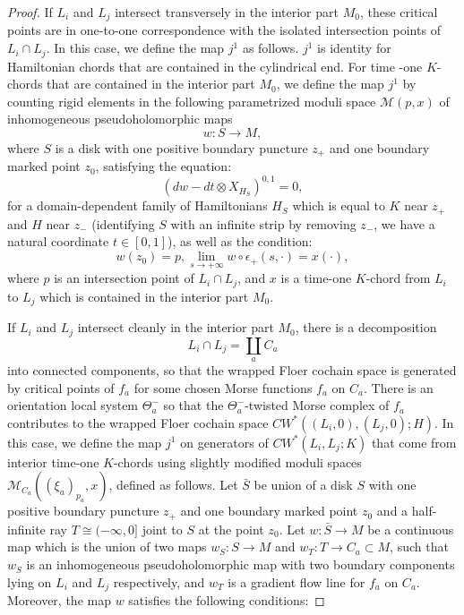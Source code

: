 \documentclass{amsart}
\numberwithin{equation}{section}
\numberwithin{figure}{section}
\begin{document}
\begin{proof}
	If $L_{i}$ and $L_{j}$ intersect transversely in the interior part $M_{0}$, these critical points are in one-to-one correspondence with the isolated intersection points of $L_{i} \cap L_{j}$. In this case, we define the map $j^{1}$ as follows. $j^{1}$ is identity for Hamiltonian chords that are contained in the cylindrical end. For time -one $K$-chords that are contained in the interior part $M_{0}$, we define the map $j^{1}$ by counting rigid elements in the following parametrized moduli space $\mathcal{M}(p, x)$ of inhomogeneous pseudoholomorphic maps
\begin{equation*}
w: S \to M,
\end{equation*}
where $S$ is a disk with one positive boundary puncture $z_{+}$ and one boundary marked point $z_{0}$, satisfying the equation:
\begin{equation*}
(dw - dt \otimes X_{H_{S}})^{0, 1} = 0,
\end{equation*}
for a domain-dependent family of Hamiltonians $H_{S}$ which is equal to $K$ near $z_{+}$ and $H$ near $z_{-}$ (identifying $S$ with an infinite strip by removing $z_{-}$, we have a natural coordinate $t \in [0, 1]$), as well as the condition:
\begin{equation*}
w(z_{0}) = p, \lim\limits_{s \to +\infty} w \circ \epsilon_{+}(s, \cdot) = x(\cdot),
\end{equation*}
where $p$ is an intersection point of $L_{i} \cap L_{j}$, and $x$ is a time-one $K$-chord from $L_{i}$ to $L_{j}$ which is contained in the interior part $M_{0}$. \par
	If $L_{i}$ and $L_{j}$ intersect cleanly in the interior part $M_{0}$, there is a decomposition
\begin{equation*}
L_{i} \cap L_{j} = \coprod_{a} C_{a}
\end{equation*}
into connected components, so that the wrapped Floer cochain space is generated by critical points of $f_{a}$ for some chosen Morse functions $f_{a}$ on $C_{a}$. There is an orientation local system $\Theta_{a}^{-}$ so that the $\Theta_{a}^{-}$-twisted Morse complex of $f_{a}$ contributes to the wrapped Floer cochain space $CW^{*}((L_{i}, 0), (L_{j}, 0); H)$. In this case, we define the map $j^{1}$ on generators of $CW^{*}(L_{i}, L_{j}; K)$ that come from interior time-one $K$-chords using slightly modified moduli spaces $\mathcal{M}_{C_{a}}((\xi_{a})_{p_{a}}, x)$, defined as follows. Let $\bar{S}$ be union of a disk $S$ with one positive boundary puncture $z_{+}$ and one boundary marked point $z_{0}$ and a half-infinite ray $T \cong (-\infty, 0]$ joint to $S$ at the point $z_{0}$. Let $w: \bar{S} \to M$ be a continuous map which is the union of two maps $w_{S}: S \to M$ and $w_{T}: T \to C_{a} \subset M$, such that $w_{S}$ is an inhomogeneous pseudoholomorphic map with two boundary components lying on $L_{i}$ and $L_{j}$ respectively, and $w_{T}$ is a gradient flow line for $f_{a}$ on $C_{a}$. Moreover, the map $w$ satisfies the following conditions:

\end{proof}
\end{document}

